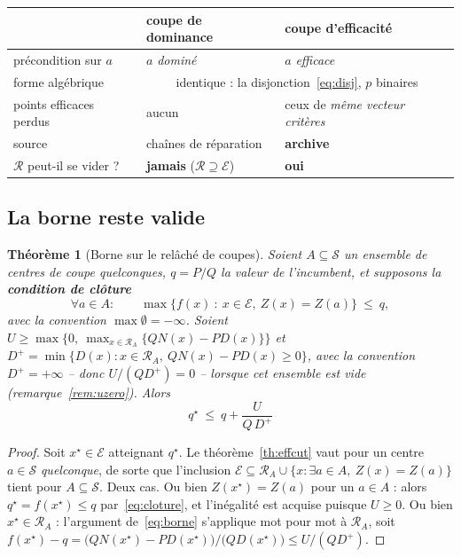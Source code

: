 \documentclass[11pt,a4paper]{article}
\theoremstyle{plain}
\newtheorem{theorem}{Théorème}
\theoremstyle{remark}
\newcommand{\Ecal}{\mathcal{E}}
\newcommand{\Scal}{\mathcal{S}}
\newcommand{\Rcal}{\mathcal{R}}
\newcommand{\qs}{q^{\star}}
\begin{document}
\begin{center}
\begin{tabular}{lll}
\toprule
& \textbf{coupe de dominance} & \textbf{coupe d'efficacité}\\
\midrule
précondition sur $a$ & $a$ \emph{dominé} & $a$ \emph{efficace}\\
forme algébrique & \multicolumn{2}{c}{identique : la disjonction~\eqref{eq:disj}, $p$ binaires}\\
points efficaces perdus & aucun & ceux de \emph{même vecteur critères}\\
source & chaînes de réparation & \textbf{archive}\\
$\Rcal$ peut-il se vider ? & \textbf{jamais} ($\Rcal\supseteq\Ecal$) & \textbf{oui}\\
\bottomrule
\end{tabular}
\end{center}

\subsection{La borne reste valide}

\begin{theorem}[Borne sur le relâché de coupes]\label{th:archbound}
Soient $A\subseteq\Scal$ un ensemble de centres de coupe \emph{quelconques},
$q=P/Q$ la valeur de l'incumbent, et supposons la \textbf{condition de
clôture}
\begin{equation}\label{eq:cloture}
  \forall a\in A:\qquad
  \max\{f(x)\ :\ x\in\Ecal,\ Z(x)=Z(a)\}\ \le\ q ,
\end{equation}
avec la convention $\max\emptyset=-\infty$.
Soient $U\ge\max\bigl\{0,\ \max_{x\in\Rcal_A}\{QN(x)-PD(x)\}\bigr\}$ et
$D^{+}=\min\{D(x):x\in\Rcal_A,\ QN(x)-PD(x)\ge 0\}$, avec la convention
$D^{+}=+\infty$ -- donc $U/(QD^{+})=0$ -- lorsque cet ensemble est vide
(remarque~\ref{rem:uzero}). Alors
\[
  \boxed{\ \qs\ \le\ q+\frac{U}{Q\,D^{+}}\ }
\]
\end{theorem}

\begin{proof}
Soit $x^{\star}\in\Ecal$ atteignant $\qs$. Le théorème~\ref{th:effcut} vaut
pour un centre $a\in\Scal$ \emph{quelconque}, de sorte que l'inclusion
$\Ecal\subseteq\Rcal_A\cup\{x:\exists a\in A,\ Z(x)=Z(a)\}$ tient pour
$A\subseteq\Scal$. Deux cas. Ou bien $Z(x^{\star})=Z(a)$ pour un
$a\in A$ : alors $\qs=f(x^{\star})\le q$ par~\eqref{eq:cloture}, et
l'inégalité est acquise puisque $U\ge 0$. Ou bien
$x^{\star}\in\Rcal_A$ : l'argument de~\eqref{eq:borne} s'applique mot pour
mot à $\Rcal_A$, soit
$f(x^{\star})-q=\bigl(QN(x^\star)-PD(x^\star)\bigr)/\bigl(Q D(x^\star)\bigr)
\le U/(Q D^{+})$.
\end{proof}
\end{document}
